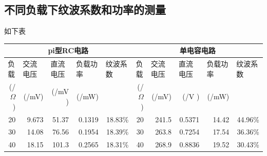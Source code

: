 \documentclass{article}
\begin{document}
\subsection*{不同负载下纹波系数和功率的测量}如下表
\begin{table}[p]
    \centering
    \begin{tabular}{|r|r|r|r|r|r|r|r|r|r|}
        \hline
        \multicolumn{5}{|c|}{pi型RC电路} & \multicolumn{5}{c|}{单电容电路} \bigstrut                                                                                                                                                                                                                                         \\
        \hline
        \multicolumn{1}{|l|}{负载}      & \multicolumn{1}{l|}{交流电压}            & \multicolumn{1}{l|}{直流电压} & \multicolumn{1}{l|}{负载功率} & \multicolumn{1}{l|}{纹波系数} & \multicolumn{1}{l|}{负载} & \multicolumn{1}{l|}{交流电压} & \multicolumn{1}{l|}{直流电压} & \multicolumn{1}{l|}{负载功率} & \multicolumn{1}{l|}{纹波系数} \bigstrut \\
        (/$\Omega$)                   & (/mV)                                & (/mV )                    & (/mW)                     &                           & (/$\Omega$)             & (/mV)                     & (/V )                     & (/mW)                     & \bigstrut                           \\
        \hline
        20                            & 9.673                                & 51.37                     & 0.1319                    & 18.83\%                   & 20                      & 241.5                     & 0.5371                    & 14.42                    & 44.96\% \bigstrut                  \\
        \hline
        30                            & 14.08                                & 76.56                     & 0.1954                    & 18.39\%                   & 30                      & 263.8                     & 0.7254                    & 17.54                    & 36.36\% \bigstrut                  \\
        \hline
        40                            & 18.15                                & 101.3                     & 0.2565                    & 18.31\%                   & 40                      & 268.9                     & 0.8836                    & 19.52                    & 30.43\% \bigstrut                  \\

\end{tabular}
\end{table}
\end{document}
